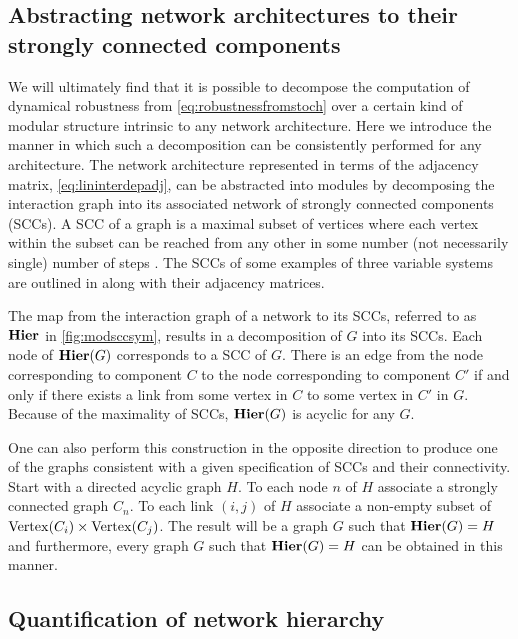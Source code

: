 \subsection{Abstracting network architectures to their strongly connected components}
We will ultimately find that it is possible to decompose the computation of dynamical robustness from \ref{eq:robustnessfromstoch} over a certain kind of modular structure intrinsic to any network architecture. Here we introduce the manner in which such a decomposition can be consistently performed for any architecture. The network architecture represented in terms of the adjacency matrix, \ref{eq:lininterdepadj}, can be abstracted into modules by decomposing the interaction graph into its associated network of strongly connected components (SCCs). A SCC of a graph is a maximal subset of vertices where each vertex within the subset can be reached from any other in some number (not necessarily single) number of steps \cite{Cormen2009}. The SCCs of some examples of three variable systems are outlined in  along with their adjacency matrices.

The map from the interaction graph of a network to its SCCs, referred to as $\mathbf{Hier}$ in \ref{fig:modsccsym}, results in a decomposition of $G$ into its SCCs. Each node of $\mathbf{Hier} (G)$ corresponds to a SCC of $G$. There is an edge from the node corresponding to component $C$ to the node corresponding to component $C'$ if and only if there exists a link from some vertex in $C$ to some vertex in $C'$ in $G$.  Because of the maximality of SCCs, $\mathbf{Hier} (G)$ is acyclic for any $G$.

One can also perform this construction in the opposite direction to produce one of the graphs consistent with a given specification of SCCs and their connectivity.  Start with a directed acyclic graph $H$.  To each node $n$ of $H$ associate
a strongly connected graph $C_n$.  To each link $(i,j)$ of $H$ associate a non-empty subset of $\mathrm{Vertex}(C_i) \times \mathrm{Vertex}(C_j)$.  The result will be a graph $G$ such that $\mathbf{Hier}(G) = H$ and furthermore, every graph $G$ such that $\mathbf{Hier}(G) = H$ can be obtained in this manner.

\subsection{Quantification of network hierarchy}

